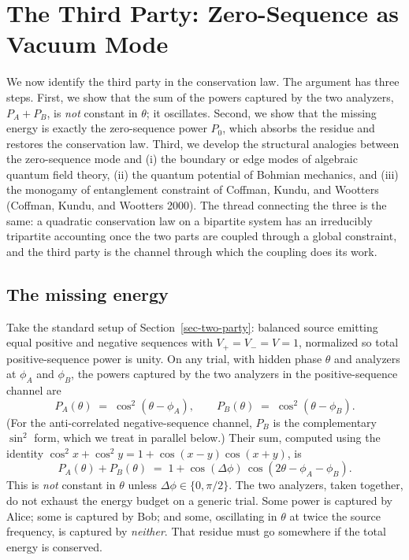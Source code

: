 \documentclass[
  11pt]{article}
\begin{document}
\newpage

\section{The Third Party: Zero-Sequence as Vacuum
Mode}\label{sec-third-party}

We now identify the third party in the conservation law. The argument
has three steps. First, we show that the sum of the powers captured by
the two analyzers, \(P_A + P_B\), is \emph{not} constant in \(\theta\);
it oscillates. Second, we show that the missing energy is exactly the
zero-sequence power \(P_0\), which absorbs the residue and restores the
conservation law. Third, we develop the structural analogies between the
zero-sequence mode and (i) the boundary or edge modes of algebraic
quantum field theory, (ii) the quantum potential of Bohmian mechanics,
and (iii) the monogamy of entanglement constraint of Coffman, Kundu, and
Wootters (Coffman, Kundu, and Wootters 2000). The thread connecting the
three is the same: a quadratic conservation law on a bipartite system
has an irreducibly tripartite accounting once the two parts are coupled
through a global constraint, and the third party is the channel through
which the coupling does its work.

\subsection{The missing energy}\label{the-missing-energy}

Take the standard setup of Section~\ref{sec-two-party}: balanced source
emitting equal positive and negative sequences with
\(V_+ = V_- = V = 1\), normalized so total positive-sequence power is
unity. On any trial, with hidden phase \(\theta\) and analyzers at
\(\phi_A\) and \(\phi_B\), the powers captured by the two analyzers in
the positive-sequence channel are \[
P_A(\theta) \;=\; \cos^2(\theta - \phi_A), \qquad P_B(\theta) \;=\; \cos^2(\theta - \phi_B).
\] (For the anti-correlated negative-sequence channel, \(P_B\) is the
complementary \(\sin^2\) form, which we treat in parallel below.) Their
sum, computed using the identity
\(\cos^2 x + \cos^2 y = 1 + \cos(x-y)\cos(x+y)\), is \[
P_A(\theta) + P_B(\theta) \;=\; 1 + \cos(\Delta\phi)\,\cos(2\theta - \phi_A - \phi_B).
\] This is \emph{not} constant in \(\theta\) unless
\(\Delta\phi \in \{0, \pi/2\}\). The two analyzers, taken together, do
not exhaust the energy budget on a generic trial. Some power is captured
by Alice; some is captured by Bob; and some, oscillating in \(\theta\)
at twice the source frequency, is captured by \emph{neither}. That
residue must go somewhere if the total energy is conserved.
\end{document}
